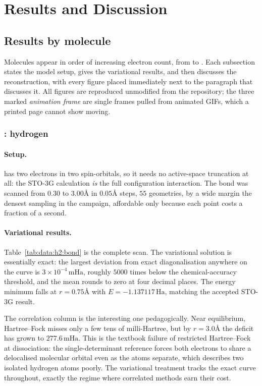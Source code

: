 \documentclass[sigconf,screen,nonacm]{acmart}
\makeatletter
\newcommand{\@resetcolroom}{%
  \ifdim\pagetotal=\z@
    \ifx\@toplist\@empty\ifx\@botlist\@empty\ifx\@midlist\@empty
      \global\@colroom\@colht
      \global\vsize\@colht
    \fi\fi\fi
  \fi}
\let\@origFloatBarrier\FloatBarrier
\renewcommand{\FloatBarrier}{\@origFloatBarrier\@resetcolroom}
\newcommand{\mHa}{\,\text{mHa}}
\newcommand{\Ha}{\,\text{Ha}}
\newcommand{\Ang}{\text{\AA}}
\makeatother
\begin{document}
\FloatBarrier
\section{Results and Discussion}
\label{sec:resdisc}

\subsection{Results by molecule}
\label{sec:results}
Molecules appear in order of increasing electron count, from  to
. Each subsection states the model setup, gives the variational
results, and then discusses the reconstruction, with every figure placed
immediately next to the paragraph that discusses it. All figures are
reproduced unmodified from the repository; the three marked \emph{animation
frame} are single frames pulled from animated GIFs, which a printed page
cannot show moving.

\subsubsection{: hydrogen}
\label{sec:h2}



\paragraph{Setup.}
 has two electrons in two spin-orbitals, so it needs no active-space
truncation at all: the STO-3G calculation \emph{is} the full configuration
interaction. The bond was scanned from $0.30$ to $3.00\Ang$ in $0.05\Ang$
steps, $55$ geometries, by a wide margin the densest sampling in the
campaign, affordable only because each point costs a fraction of a second.

\paragraph{Variational results.}
Table~\ref{tab:data:h2:bond} is the complete scan. The variational solution
is essentially exact: the largest deviation from exact diagonalisation
anywhere on the curve is $3\times10^{-4}\mHa$, roughly $5000$ times below the
chemical-accuracy threshold, and the mean rounds to zero at four decimal
places. The energy minimum falls at $r=0.75\Ang$ with $E=-1.137117\Ha$,
matching the accepted STO-3G result.

The correlation column is the interesting one pedagogically. Near
equilibrium, Hartree--Fock misses only a few tens of milli-Hartree, but by
$r=3.0\Ang$ the deficit has grown to $277.6\mHa$. This is the textbook
failure of restricted Hartree--Fock at dissociation: the single-determinant
reference forces both electrons to share a delocalised molecular orbital even
as the atoms separate, which describes two isolated hydrogen atoms poorly.
The variational treatment tracks the exact curve throughout, exactly the
regime where correlated methods earn their cost.
\end{document}
